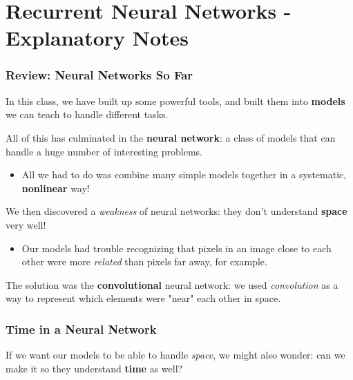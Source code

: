 

\setcounter{chapter}{8} %

\chapter{Recurrent Neural Networks - Explanatory Notes}

    \subsection{Review: Neural Networks So Far}

        In this class, we have built up some powerful tools, and built them into \textbf{models} we can teach to handle different tasks.
        
        All of this has culminated in the \textbf{neural network}: a class of models that can handle a huge number of interesting problems.
        
            \begin{itemize}
                \item All we had to do was combine many simple models together in a systematic, \textbf{nonlinear} way!
            \end{itemize}
        
        We then discovered a \textit{weakness} of neural networks: they don't understand \textbf{space} very well! 
            \begin{itemize}
                \item Our models had trouble recognizing that pixels in an image close to each other were more \textit{related} than pixels far away, for example.
            \end{itemize}
            
        The solution was the \textbf{convolutional} neural network: we used \textit{convolution} as a way to represent which elements were "near" each other in space.
        
    \secdiv
        
    \subsection{Time in a Neural Network}
    
        If we want our models to be able to handle \textit{space}, we might also wonder: can we make it so they understand \textbf{time} as well?
        
